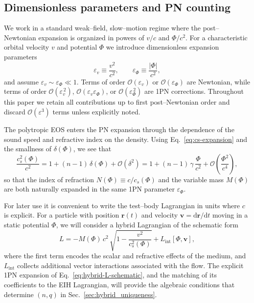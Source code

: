 \documentclass[11pt]{article}
\newcommand{\cS}{c_s}
\newcommand{\dd}{\mathrm{d}}
\newcommand{\ve}{\varepsilon}
\newcommand{\br}{\mathbf{r}}
\newcommand{\bv}{\mathbf{v}}
\begin{document}
\subsection{Dimensionless parameters and PN counting}
\label{subsec:thermo-pn-counting}

We work in a standard weak--field, slow--motion regime where the
post--Newtonian expansion is organized in powers of $v/c$ and $\Phi/c^2$.
For a characteristic orbital velocity $v$ and potential $\Phi$ we introduce
dimensionless expansion parameters
\begin{equation}
  \ve_v \equiv \frac{v^2}{c^2},
  \qquad
  \ve_\Phi \equiv \frac{|\Phi|}{c^2},
  \label{eq:pn-parameters}
\end{equation}
and assume $\ve_v \sim \ve_\Phi \ll 1$.  Terms of order
$\mathcal{O}(\ve_v)$ or $\mathcal{O}(\ve_\Phi)$ are Newtonian, while terms
of order $\mathcal{O}(\ve_v^{\,2})$, $\mathcal{O}(\ve_v\ve_\Phi)$, or
$\mathcal{O}(\ve_\Phi^{\,2})$ are 1PN corrections.  Throughout this paper we
retain all contributions up to first post--Newtonian order and discard
$\mathcal{O}(\ve^3)$ terms unless explicitly noted.

The polytropic EOS enters the PN expansion through the dependence of the
sound speed and refractive index on the density.  Using
Eq.~\eqref{eq:cs-expansion} and the smallness of $\delta(\Phi)$, we see that
\begin{equation}
  \frac{\cS^2(\Phi)}{c^2}
  = 1 + (n-1)\,\delta(\Phi) + \mathcal{O}(\delta^2)
  = 1 + (n-1)\,\gamma\,\frac{\Phi}{c^2}
    + \mathcal{O}\!\left(\frac{\Phi^2}{c^4}\right),
  \label{eq:cs-of-Phi}
\end{equation}
so that the index of refraction $N(\Phi) \equiv c/\cS(\Phi)$ and the
variable mass $M(\Phi)$ are both naturally expanded in the same 1PN
parameter $\ve_\Phi$.

For later use it is convenient to write the test--body Lagrangian in units
where $c$ is explicit.  For a particle with position $\br(t)$ and velocity
$\bv = \dd\br/\dd t$ moving in a static potential $\Phi$, we will consider a
hybrid Lagrangian of the schematic form
\begin{equation}
  L
  = -M(\Phi)\,c^2\,\sqrt{1 - \frac{v^2}{\cS^2(\Phi)}}
  + L_{\text{int}}[\Phi,\bv],
  \label{eq:hybrid-L-schematic}
\end{equation}
where the first term encodes the scalar and refractive effects of the
medium, and $L_{\text{int}}$ collects additional vector interactions
associated with the flow.  The explicit 1PN expansion of
Eq.~\eqref{eq:hybrid-L-schematic}, and the matching of its coefficients to
the EIH Lagrangian, will provide the algebraic conditions that determine
$(n,q)$ in Sec.~\ref{sec:hybrid_uniqueness}.
\end{document}
